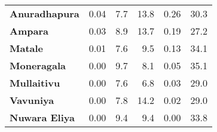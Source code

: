 \begin{tabular}{lrrrrr}
\textbf{Anuradhapura} &        0.04 &         7.7 &         13.8 &             0.26 &        30.3 \\
\textbf{Ampara      } &        0.03 &         8.9 &         13.7 &             0.19 &        27.2 \\
\textbf{Matale      } &        0.01 &         7.6 &          9.5 &             0.13 &        34.1 \\
\textbf{Moneragala  } &        0.00 &         9.7 &          8.1 &             0.05 &        35.1 \\
\textbf{Mullaitivu  } &        0.00 &         7.6 &          6.8 &             0.03 &        29.0 \\
\textbf{Vavuniya    } &        0.00 &         7.8 &         14.2 &             0.02 &        29.0 \\
\textbf{Nuwara Eliya} &        0.00 &         9.4 &          9.4 &             0.00 &        33.8 \\
\bottomrule
\end{tabular}
